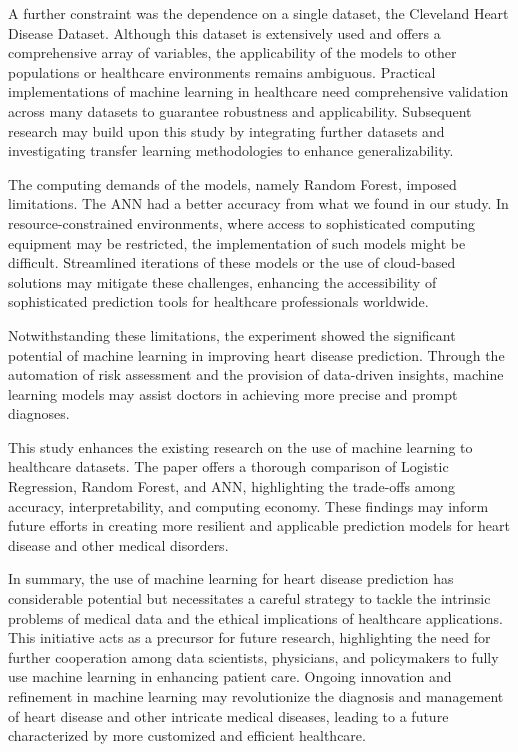 A further constraint was the dependence on a single dataset, the Cleveland Heart Disease Dataset. Although this dataset is extensively used and offers a comprehensive array of variables, the applicability of the models to other populations or healthcare environments remains ambiguous. Practical implementations of machine learning in healthcare need comprehensive validation across many datasets to guarantee robustness and applicability. Subsequent research may build upon this study by integrating further datasets and investigating transfer learning methodologies to enhance generalizability.

The computing demands of the models, namely Random Forest, imposed limitations. The ANN had a better accuracy from what we found in our study. In resource-constrained environments, where access to sophisticated computing equipment may be restricted, the implementation of such models might be difficult. Streamlined iterations of these models or the use of cloud-based solutions may mitigate these challenges, enhancing the accessibility of sophisticated prediction tools for healthcare professionals worldwide.

Notwithstanding these limitations, the experiment showed the significant potential of machine learning in improving heart disease prediction. Through the automation of risk assessment and the provision of data-driven insights, machine learning models may assist doctors in achieving more precise and prompt diagnoses. 

This study enhances the existing research on the use of machine learning to healthcare datasets. The paper offers a thorough comparison of Logistic Regression, Random Forest, and ANN, highlighting the trade-offs among accuracy, interpretability, and computing economy. These findings may inform future efforts in creating more resilient and applicable prediction models for heart disease and other medical disorders.

In summary, the use of machine learning for heart disease prediction has considerable potential but necessitates a careful strategy to tackle the intrinsic problems of medical data and the ethical implications of healthcare applications. This initiative acts as a precursor for future research, highlighting the need for further cooperation among data scientists, physicians, and policymakers to fully use machine learning in enhancing patient care. Ongoing innovation and refinement in machine learning may revolutionize the diagnosis and management of heart disease and other intricate medical diseases, leading to a future characterized by more customized and efficient healthcare.
